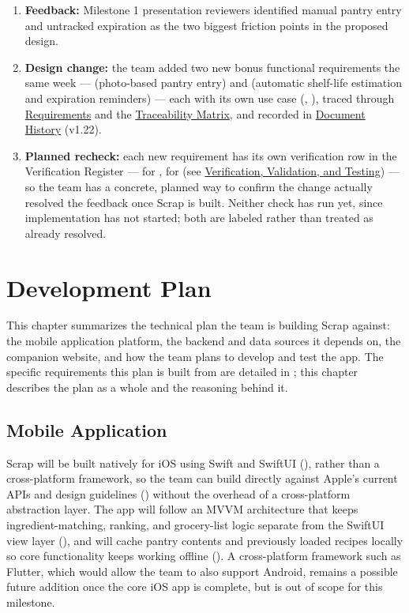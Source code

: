 \begin{enumerate}
\item \textbf{Feedback:} Milestone 1 presentation reviewers identified manual pantry entry and untracked expiration as the two biggest friction points in the proposed design.
\item \textbf{Design change:} the team added two new bonus functional requirements the same week ---  (photo-based pantry entry) and  (automatic shelf-life estimation and expiration reminders) --- each with its own use case (, ), traced through \hyperref[Chapter:Requirements]{Requirements} and the \hyperref[Chapter:Traceability]{Traceability Matrix}, and recorded in \hyperref[Chapter:DocumentHistory]{Document History} (v1.22).
\item \textbf{Planned recheck:} each new requirement has its own verification row in the Verification Register ---  for ,  for  (see \hyperref[Chapter:VerificationValidationTesting]{Verification, Validation, and Testing}) --- so the team has a concrete, planned way to confirm the change actually resolved the feedback once Scrap is built. Neither check has run yet, since implementation has not started; both are labeled \StatusPending rather than treated as already resolved.
\end{enumerate}

\chapter{Development Plan}
This chapter summarizes the technical plan the team is building Scrap against: the mobile application platform, the backend and data sources it depends on, the companion website, and how the team plans to develop and test the app. The specific requirements this plan is built from are detailed in ; this chapter describes the plan as a whole and the reasoning behind it.

\section{Mobile Application}
Scrap will be built natively for iOS using Swift and SwiftUI \cite{AppleSwiftUIDocs} (), rather than a cross-platform framework, so the team can build directly against Apple's current APIs and design guidelines () without the overhead of a cross-platform abstraction layer. The app will follow an MVVM architecture that keeps ingredient-matching, ranking, and grocery-list logic separate from the SwiftUI view layer (), and will cache pantry contents and previously loaded recipes locally so core functionality keeps working offline (). A cross-platform framework such as Flutter, which would allow the team to also support Android, remains a possible future addition once the core iOS app is complete, but is out of scope for this milestone.

